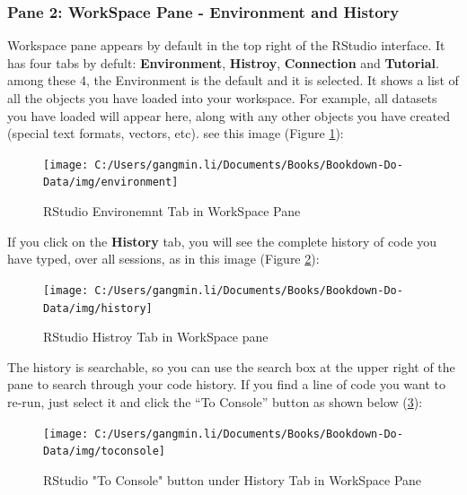 \documentclass[
]{book}
\begin{document}
\hypertarget{pane-2-workspace-pane---environment-and-history}{%
\subsubsection*{Pane 2: WorkSpace Pane - Environment and History}\label{pane-2-workspace-pane---environment-and-history}}


Workspace pane appears by default in the top right of the RStudio interface. It has four tabs by defult: \textbf{Environment}, \textbf{Histroy}, \textbf{Connection} and \textbf{Tutorial}. among these 4, the Environment is the default and it is selected. It shows a list of all the objects you have loaded into your workspace. For example, all datasets you have loaded will appear here, along with any other objects you have created (special text formats, vectors, etc). see this image (Figure \ref{fig:RStudioEven}):

\begin{figure}

{\centering \texttt{[image: C:/Users/gangmin.li/Documents/Books/Bookdown-Do-Data/img/environment]} 

}

\caption{RStudio Environemnt Tab in WorkSpace Pane}\label{fig:RStudioEven}
\end{figure}

If you click on the \textbf{History} tab, you will see the complete history of code you have typed, over all sessions, as in this image (Figure \ref{fig:RStudiohist}):

\begin{figure}

{\centering \texttt{[image: C:/Users/gangmin.li/Documents/Books/Bookdown-Do-Data/img/history]} 

}

\caption{RStudio Histroy Tab in WorkSpace pane}\label{fig:RStudiohist}
\end{figure}

The history is searchable, so you can use the search box at the upper right of the pane to search through your code history. If you find a line of code you want to re-run, just select it and click the ``To Console'' button as shown below (\ref{fig:RStoconsole}):

\begin{figure}

{\centering \texttt{[image: C:/Users/gangmin.li/Documents/Books/Bookdown-Do-Data/img/toconsole]} 

}

\caption{RStudio "To Console" button under History Tab in WorkSpace Pane}\label{fig:RStoconsole}
\end{figure}
\end{document}
